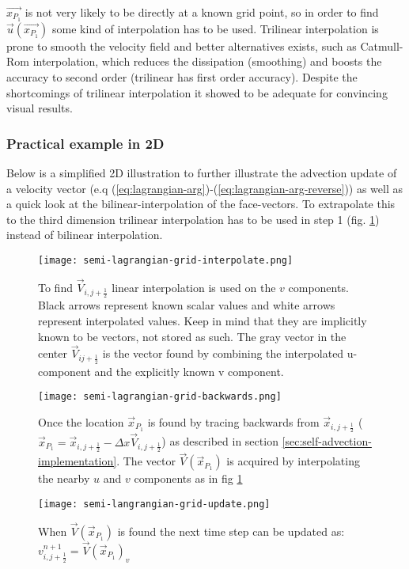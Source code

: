 \begin{math} \vec{x_{P_1}} \end{math} is not very likely to be directly at a known grid point, so in order to find \begin{math} \vec{u}(\vec{x_{P_1}}) \end{math} some kind of interpolation has to be used. Trilinear interpolation is prone to smooth the velocity field and better alternatives exists, such as Catmull-Rom interpolation, which reduces the dissipation (smoothing) and boosts the accuracy to second order (trilinear has first order accuracy). Despite the shortcomings of trilinear interpolation it showed to be adequate for convincing visual results.

\subsubsection{Practical example in 2D}
Below is a simplified 2D illustration to further illustrate the advection update of a velocity vector (e.q (\ref{eq:lagrangian-arg})-(\ref{eq:lagrangian-arg-reverse})) as well as a quick look at the bilinear-interpolation of the face-vectors. To extrapolate this to the third dimension trilinear interpolation has to be used in step 1 (fig. \ref{fig:bilinear-interpolation}) instead of bilinear interpolation. 
\begin{figure}[H]
\centering
\texttt{[image: semi-lagrangian-grid-interpolate.png]}
\caption{To find $\vec{V}_{i,j+\frac{1}{2}}$ linear interpolation is used on the $v$ components. Black arrows represent known scalar values and white arrows represent interpolated values. Keep in mind that they are implicitly known to be vectors, not stored as such. The gray vector in the center $\vec{V}_{{i}{j+\frac{1}{2}}}$ is the vector found by combining the interpolated u-component and the explicitly known v component.}
\label{fig:bilinear-interpolation}
\end{figure}

\begin{figure}[H]
\centering
\texttt{[image: semi-lagrangian-grid-backwards.png]}
\caption{Once the location $\vec{x}_{P_1}$ is found by tracing backwards from $\vec{x}_{i,j+\frac{1}{2}}$ ($\vec{x}_{P_1} = \vec{x}_{i,j+\frac{1}{2}}-\Delta x \vec{V}_{i,j+\frac{1}{2}}$) as described in section \ref{sec:self-advection-implementation}. The vector $\vec{V}(\vec{x}_{P_1})$ is acquired by interpolating the nearby $u$ and $v$ components as in fig \ref{fig:bilinear-interpolation} }
\end{figure}

\begin{figure}[H]
\centering
\texttt{[image: semi-langrangian-grid-update.png]}
\caption{When $\vec{V}(\vec{x}_{P_1})$ is found the next time step can be updated as: $v^{n+1}_{i,j+\frac{1}{2}} = \vec{V}(\vec{x}_{P_1})_{v} $}
\end{figure}
